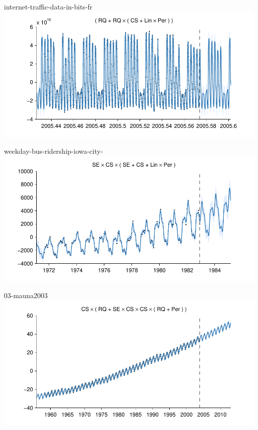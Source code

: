 \begin{frame}{internet-traffic-data-in-bits-fr}
  \center
  \includegraphics[width=1.0\textwidth]{figures/internet-traffic-data-in-bits-fr/internet-traffic-data-in-bits-fr_all}
\end{frame}  

\begin{frame}{weekday-bus-ridership-iowa-city-}
  \center
  \includegraphics[width=1.0\textwidth]{figures/weekday-bus-ridership-iowa-city-/weekday-bus-ridership-iowa-city-_all}
\end{frame}  

\begin{frame}{03-mauna2003}
  \center
  \includegraphics[width=1.0\textwidth]{figures/03-mauna2003/03-mauna2003_all}
\end{frame} 

